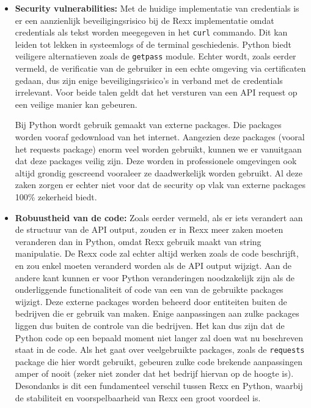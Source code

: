 \begin{itemize}
Voor beide talen zou er kunnen gekozen worden om bepaalde zaken uit de code te modulariseren (stukken code in andere bestanden steken om nadien aan te roepen vanuit het huidige bestand). Door de beperkte grootte van de scripts is dat hier niet noodzakelijk. In dat geval zou er voor Rexx wel een en ander ingesteld moeten worden om de scripts goed met elkaar te laten communiceren.

\item \textbf{Security vulnerabilities:}
Met de huidige implementatie van credentials is er een aanzienlijk beveiligingsrisico bij de Rexx implementatie omdat credentials als tekst worden meegegeven in het \texttt{curl} commando. Dit kan leiden tot lekken in systeemlogs of de terminal geschiedenis. Python biedt veiligere alternatieven zoals de \texttt{getpass} module. Echter wordt, zoals eerder vermeld, de verificatie van de gebruiker in een echte omgeving via certificaten gedaan, dus zijn enige beveiligingsrisico's in verband met de credentials irrelevant. Voor beide talen geldt dat het versturen van een API request op een veilige manier kan gebeuren.

Bij Python wordt gebruik gemaakt van externe packages. Die packages worden vooraf gedownload van het internet. Aangezien deze packages (vooral het requests package) enorm veel worden gebruikt, kunnen we er vanuitgaan dat deze packages veilig zijn. Deze worden in professionele omgevingen ook altijd grondig gescreend vooraleer ze daadwerkelijk worden gebruikt. Al deze zaken zorgen er echter niet voor dat de security op vlak van externe packages 100\% zekerheid biedt.

\item \textbf{Robuustheid van de code:}
Zoals eerder vermeld, als er iets verandert aan de structuur van de API output, zouden er in Rexx meer zaken moeten veranderen dan in Python, omdat Rexx gebruik maakt van string manipulatie. De Rexx code zal echter altijd werken zoals de code beschrijft, en zou enkel moeten veranderd worden als de API output wijzigt. Aan de andere kant kunnen er voor Python veranderingen noodzakelijk zijn als de onderliggende functionaliteit of code van een van de gebruikte packages wijzigt. Deze externe packages worden beheerd door entiteiten buiten de bedrijven die er gebruik van maken. Enige aanpassingen aan zulke packages liggen dus buiten de controle van die bedrijven. Het kan dus zijn dat de Python code op een bepaald moment niet langer zal doen wat nu beschreven staat in de code. Als het gaat over veelgebruikte packages, zoals de \texttt{requests} package die hier wordt gebruikt, gebeuren zulke code brekende aanpassingen amper of nooit (zeker niet zonder dat het bedrijf hiervan op de hoogte is). Desondanks is dit een fundamenteel verschil tussen Rexx en Python, waarbij de stabiliteit en voorspelbaarheid van Rexx een groot voordeel is.


\end{itemize}
